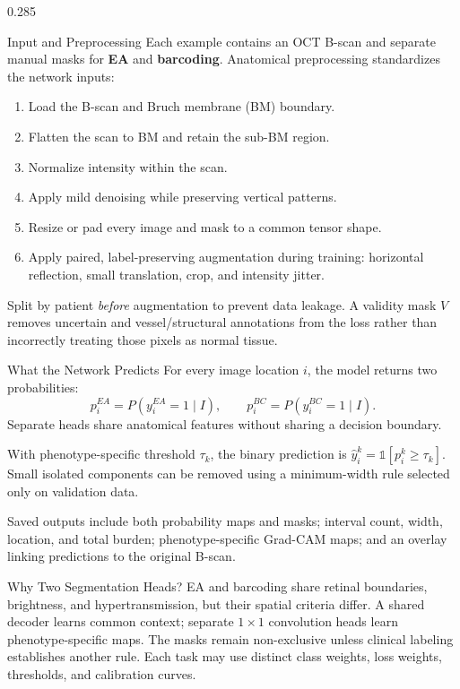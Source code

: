 \documentclass[final]{beamer}
\newcommand{\EA}{\textcolor{EAOrange}{\textbf{EA}}}
\newcommand{\Barcode}{\textcolor{BarcodeRed}{\textbf{barcoding}}}
\begin{document}
\begin{frame}[t]
\begin{columns}[t,totalwidth=\dimexpr\paperwidth-4cm\relax]
\begin{column}{0.285\textwidth}
  \begin{block}{Input and Preprocessing}
    Each example contains an OCT B-scan and separate manual masks for \EA{} and
    \Barcode. Anatomical preprocessing standardizes the network inputs:
    \begin{enumerate}
      \item Load the B-scan and Bruch membrane (BM) boundary.
      \item Flatten the scan to BM and retain the sub-BM region.
      \item Normalize intensity within the scan.
      \item Apply mild denoising while preserving vertical patterns.
      \item Resize or pad every image and mask to a common tensor shape.
      \item Apply paired, label-preserving augmentation during training:
        horizontal reflection, small translation, crop, and intensity jitter.
    \end{enumerate}
    Split by patient \emph{before} augmentation to prevent data leakage. A
    validity mask $V$ removes uncertain and vessel/structural annotations from
    the loss rather than incorrectly treating those pixels as normal tissue.
  \end{block}

  \begin{block}{What the Network Predicts}
    For every image location $i$, the model returns two probabilities:
    \[
      p_i^{EA}=P(y_i^{EA}=1\mid I), \qquad
      p_i^{BC}=P(y_i^{BC}=1\mid I).
    \]
    Separate heads share anatomical features without sharing a decision boundary.

    \vspace{0.25cm}
    With phenotype-specific threshold $\tau_k$, the binary prediction is
    $\hat y_i^k=\mathbb{1}[p_i^k\geq\tau_k]$. Small isolated components can be
    removed using a minimum-width rule selected only on validation data.

    \vspace{0.35cm}
    Saved outputs include both probability maps and masks; interval count,
    width, location, and total burden; phenotype-specific Grad-CAM maps; and an
    overlay linking predictions to the original B-scan.
  \end{block}

  \begin{block}{Why Two Segmentation Heads?}
    EA and barcoding share retinal boundaries, brightness, and hypertransmission,
    but their spatial criteria differ. A shared decoder learns common context;
    separate $1\!\times\!1$ convolution heads learn phenotype-specific maps.
    The masks remain non-exclusive unless clinical labeling establishes another
    rule. Each task may use distinct class weights, loss weights, thresholds,
    and calibration curves.
  \end{block}
\end{column}


\end{columns}
\end{frame}
\end{document}
